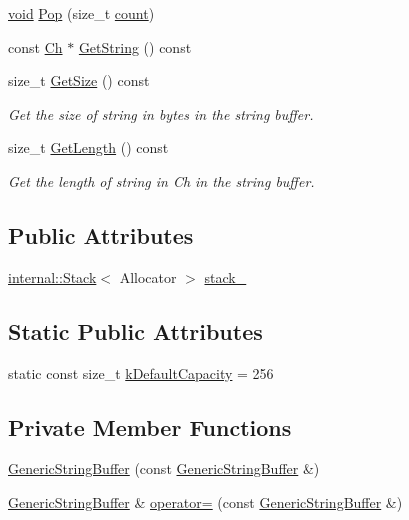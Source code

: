 \begin{DoxyCompactItemize}
\item 
\hyperlink{imgui__impl__opengl3__loader_8h_ac668e7cffd9e2e9cfee428b9b2f34fa7}{void} \hyperlink{classGenericStringBuffer_a0038e53ba03c271bc4cbbac403ec4de4}{Pop} (size\+\_\+t \hyperlink{imgui__impl__opengl3__loader_8h_a619bc20e8198de3bd3f3d7fc34de66b2}{count})
\item 
const \hyperlink{classGenericStringBuffer_a735b75db076ffe86d0d294be49655d46}{Ch} $\ast$ \hyperlink{classGenericStringBuffer_ab06b8c5f1385bd3dfd4caea8b7510f0b}{Get\+String} () const
\item 
size\+\_\+t \hyperlink{classGenericStringBuffer_a725e862b9a78375f5363b0b61ad789f3}{Get\+Size} () const
\begin{DoxyCompactList}\small\item\em Get the size of string in bytes in the string buffer. \end{DoxyCompactList}\item 
size\+\_\+t \hyperlink{classGenericStringBuffer_ad324b8154be3354dda3aa4a0a7361499}{Get\+Length} () const
\begin{DoxyCompactList}\small\item\em Get the length of string in Ch in the string buffer. \end{DoxyCompactList}\end{DoxyCompactItemize}
\subsection*{Public Attributes}
\begin{DoxyCompactItemize}
\item 
\hyperlink{classinternal_1_1Stack}{internal\+::\+Stack}$<$ Allocator $>$ \hyperlink{classGenericStringBuffer_aaef716643febb9de5957dbf8ff904409}{stack\+\_\+}
\end{DoxyCompactItemize}
\subsection*{Static Public Attributes}
\begin{DoxyCompactItemize}
\item 
static const size\+\_\+t \hyperlink{classGenericStringBuffer_ae74f9df854dd5a7db4315ef44b016d22}{k\+Default\+Capacity} = 256
\end{DoxyCompactItemize}
\subsection*{Private Member Functions}
\begin{DoxyCompactItemize}
\item 
\hyperlink{classGenericStringBuffer_aec9340c9906ce399bb142706a61a9501}{Generic\+String\+Buffer} (const \hyperlink{classGenericStringBuffer}{Generic\+String\+Buffer} \&)
\item 
\hyperlink{classGenericStringBuffer}{Generic\+String\+Buffer} \& \hyperlink{classGenericStringBuffer_a09937913fd2f426be04ae6d6a8abb0f6}{operator=} (const \hyperlink{classGenericStringBuffer}{Generic\+String\+Buffer} \&)
\end{DoxyCompactItemize}


